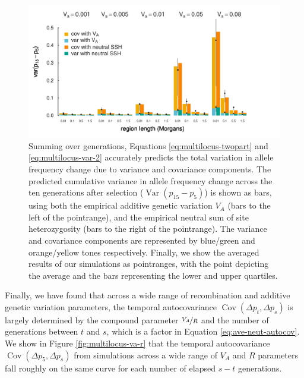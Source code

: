 \documentclass[11pt]{article}
\DeclareMathOperator{\var}{Var}
\DeclareMathOperator{\cov}{Cov}
\begin{document}
\begin{figure}[!ht]
  \centering
  \includegraphics{./images/cummulative-cov-var-all.pdf}

  \caption{Summing over generations, Equations \eqref{eq:multilocus-twopart}
    and \eqref{eq:multilocus-var-2} accurately predicts the total variation in
    allele frequency change due to variance and covariance components. The
    predicted cumulative variance in allele frequency change across the ten
    generations after selection ($\var(p_{15} - p_5)$) is shown as bars, using
    both the empirical additive genetic variation $V_A$ (bars to the left of
    the pointrange), and the empirical neutral sum of site heterozygosity (bars
    to the right of the pointrange). The variance and covariance components are
    represented by blue/green and orange/yellow tones respectively. Finally, we
    show the averaged results of our simulations as pointranges, with the point
  depicting the average and the bars representing the lower and upper
quartiles.} \label{fig:multilocus-expfit-cumcov}

\end{figure}

Finally, we have found that across a wide range of recombination and additive
genetic variation parameters, the temporal autocovariance $\cov(\Delta p_t,
\Delta p_s)$ is largely determined by the compound parameter $\nicefrac{V_A}{R}$
and the number of generations between $t$ and $s$, which is a factor in
Equation \eqref{eq:ave-neut-autocov}. We show in Figure
\ref{fig:multilocus-va-r} that the temporal autocovariance $\cov(\Delta p_5,
\Delta p_s)$ from simulations across a wide range of $V_A$ and $R$ parameters
fall roughly on the same curve for each number of elapsed $s-t$ generations.
\end{document}
